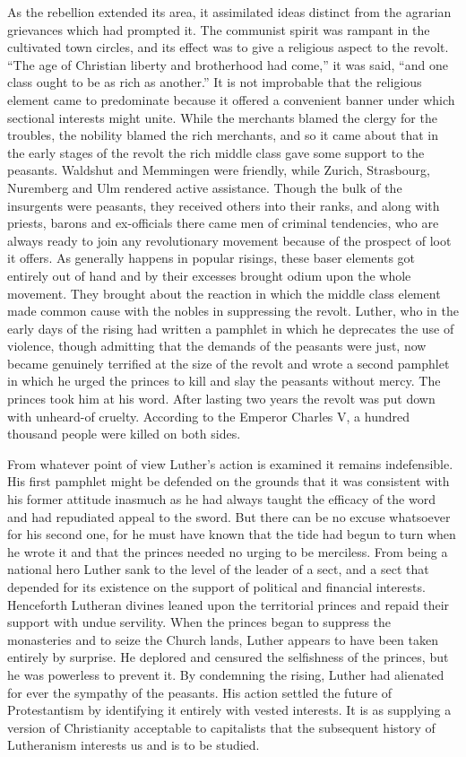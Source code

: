 \documentclass{book}
\begin{document}
As the rebellion extended its area, it assimilated ideas distinct from the agrarian grievances which had prompted it. The communist spirit was rampant in the cultivated town circles, and its effect was to give a religious aspect to the revolt. “The age of Christian liberty and brotherhood had come,” it was said, “and one class ought to be as rich as another.” It is not improbable that the religious element came to predominate because it offered a convenient banner under which sectional interests might unite. While the merchants blamed the clergy for the troubles, the nobility blamed the rich merchants, and so it came about that in the early stages of the revolt the rich middle class gave some support to the peasants. Waldshut and Memmingen were friendly, while Zurich, Strasbourg, Nuremberg and Ulm rendered active assistance. Though the bulk of the insurgents were peasants, they received others into their ranks, and along with priests, barons and ex-officials there came men of criminal tendencies, who are always ready to join any revolutionary movement because of the prospect of loot it offers. As generally happens in popular risings, these baser elements got entirely out of hand and by their excesses brought odium upon the whole movement. They brought about the reaction in which the middle class element made common cause with the nobles in suppressing the revolt. Luther, who in the early days of the rising had written a pamphlet in which he deprecates the use of violence, though admitting that the demands of the peasants were just, now became genuinely terrified at the size of the revolt and wrote a second pamphlet in which he urged the princes to kill and slay the peasants without mercy. The princes took him at his word. After lasting two years the revolt was put down with unheard-of cruelty. According to the Emperor Charles V, a hundred thousand people were killed on both sides.

From whatever point of view Luther’s action is examined it remains indefensible. His first pamphlet might be defended on the grounds that it was consistent with his former attitude inasmuch as he had always taught the efficacy of the word and had repudiated appeal to the sword. But there can be no excuse whatsoever for his second one, for he must have known that the tide had begun to turn when he wrote it and that the princes needed no urging to be merciless. From being a national hero Luther sank to the level of the leader of a sect, and a sect that depended for its existence on the support of political and financial interests. Henceforth Lutheran divines leaned upon the territorial princes and repaid their support with undue servility. When the princes began to suppress the monasteries and to seize the Church lands, Luther appears to have been taken entirely by surprise. He deplored and censured the selfishness of the princes, but he was powerless to prevent it. By condemning the rising, Luther had alienated for ever the sympathy of the peasants. His action settled the future of Protestantism by identifying it entirely with vested interests. It is as supplying a version of Christianity acceptable to capitalists that the subsequent history of Lutheranism interests us and is to be studied.
\end{document}
